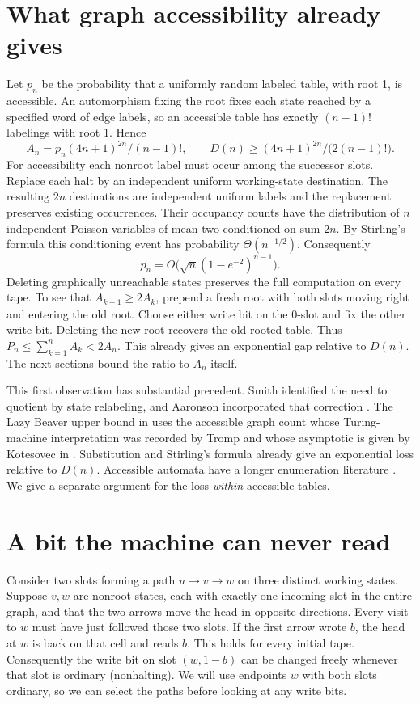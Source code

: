 \documentclass[11pt]{article}
\begin{document}
\section{What graph accessibility already gives}
Let $p_n$ be the probability that a uniformly random labeled table, with root 1, is accessible. An automorphism fixing the root fixes each state reached by a specified word of edge labels, so an accessible table has exactly $(n-1)!$ labelings with root 1. Hence
\[
 A_n=p_n(4n+1)^{2n}/(n-1)!,\qquad
 D(n)\ge (4n+1)^{2n}/\bigl(2(n-1)!\bigr).
\]
For accessibility each nonroot label must occur among the successor slots. Replace each halt by an independent uniform working-state destination. The resulting $2n$ destinations are independent uniform labels and the replacement preserves existing occurrences. Their occupancy counts have the distribution of $n$ independent Poisson variables of mean two conditioned on sum $2n$. By Stirling's formula this conditioning event has probability $\Theta(n^{-1/2})$. Consequently
\[
 p_n=O\bigl(\sqrt n(1-e^{-2})^{n-1}\bigr).
\]
Deleting graphically unreachable states preserves the full computation on every tape. To see that $A_{k+1}\ge 2A_k$, prepend a fresh root with both slots moving right and entering the old root. Choose either write bit on the 0-slot and fix the other write bit. Deleting the new root recovers the old rooted table. Thus $P_n\le\sum_{k=1}^n A_k<2A_n$. This already gives an exponential gap relative to $D(n)$. The next sections bound the ratio to $A_n$ itself.

This first observation has substantial precedent. Smith identified the need to quotient by state relabeling, and Aaronson incorporated that correction \cite{discussion}. The Lazy Beaver upper bound in \cite{oeislb} uses the accessible graph count whose Turing-machine interpretation was recorded by Tromp and whose asymptotic is given by Kotesovec in \cite{oeisgraph}. Substitution and Stirling's formula already give an exponential loss relative to $D(n)$. Accessible automata have a longer enumeration literature \cite{automata}. We give a separate argument for the loss \emph{within} accessible tables.

\section{A bit the machine can never read}
Consider two slots forming a path $u\longrightarrow v\longrightarrow w$ on three distinct working states. Suppose $v,w$ are nonroot states, each with exactly one incoming slot in the entire graph, and that the two arrows move the head in opposite directions. Every visit to $w$ must have just followed those two slots. If the first arrow wrote $b$, the head at $w$ is back on that cell and reads $b$. This holds for every initial tape. Consequently the write bit on slot $(w,1-b)$ can be changed freely whenever that slot is ordinary (nonhalting). We will use endpoints $w$ with both slots ordinary, so we can select the paths before looking at any write bits.
\end{document}
